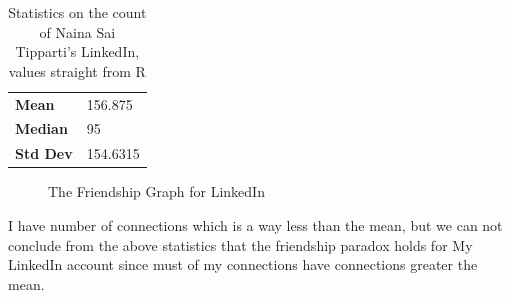 
\clearpage
\vspace*{2mm}
\begin{table}
\centering
\begin{tabular}{ l l }
\hline
\textbf{Mean} & 156.875 \\
\textbf{Median} & 95 \\
\textbf{Std Dev} & 154.6315
\\
\hline
\end{tabular}
\caption{Statistics on the count of Naina Sai Tipparti's LinkedIn, values straight from R}
\label{tab:q3stats}
\end{table}
\begin{figure}[h!]
\centering
{}
\caption{The Friendship Graph for LinkedIn}
\label{fig:linkedin_graph}
\end{figure}
I have number of connections which is a way less than the mean, but we can not conclude from the above statistics that the friendship paradox holds for My LinkedIn account since must of my connections have connections greater the mean. 